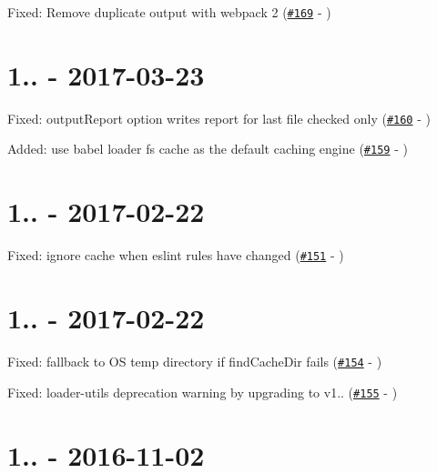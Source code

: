 
\begin{DoxyItemize}
\item Fixed\+: Remove duplicate output with webpack 2 (\href{https://github.com/MoOx/eslint-loader/pull/169}{\tt \#169} -\/ )
\end{DoxyItemize}

\section*{1.. -\/ 2017-\/03-\/23}


\begin{DoxyItemize}
\item Fixed\+: output\+Report option writes report for last file checked only (\href{https://github.com/MoOx/eslint-loader/pull/160}{\tt \#160} -\/ )
\item Added\+: use babel loader fs cache as the default caching engine (\href{https://github.com/MoOx/eslint-loader/pull/159}{\tt \#159} -\/ )
\end{DoxyItemize}

\section*{1.. -\/ 2017-\/02-\/22}


\begin{DoxyItemize}
\item Fixed\+: ignore cache when eslint rules have changed (\href{https://github.com/MoOx/eslint-loader/pull/151}{\tt \#151} -\/ )
\end{DoxyItemize}

\section*{1.. -\/ 2017-\/02-\/22}


\begin{DoxyItemize}
\item Fixed\+: fallback to OS temp directory if find\+Cache\+Dir fails (\href{https://github.com/MoOx/eslint-loader/pull/154}{\tt \#154} -\/ )
\item Fixed\+: {\ttfamily loader-\/utils} deprecation warning by upgrading to v1.. (\href{https://github.com/MoOx/eslint-loader/pull/155}{\tt \#155} -\/ )
\end{DoxyItemize}

\section*{1.. -\/ 2016-\/11-\/02}


